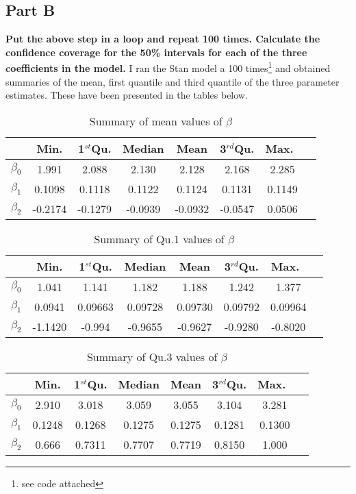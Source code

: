 \documentclass{article}
\begin{document}
\subsection{Part B}
\textbf{Put the above step in a loop and repeat 100 times. Calculate the confidence coverage for the 50\% intervals for each of the three coefficients in the model.} I ran the Stan model a 100 times\footnote{see code attached} and obtained summaries of the mean, first quantile and third quantile of the three parameter estimates. These have been presented in the tables below.
\begin{table}[H]
\caption {Summary of mean values of $\beta$}
\vspace{2mm}
\centering \begin{tabular}{c c c c c c c c} 
\hline\hline 
\vspace{1mm}
& Min. & 1$^{st}$Qu. &  Median &  Mean &  3$^{rd}$Qu.& Max.\ \\ [0.5ex] 
\hline 
$\beta_0$ & 1.991   &   2.088  &  2.130  & 2.128   &  2.168  &  2.285  \\ 
$\beta_1$ & 0.1098   &   0.1118  &  0.1122   & 0.1124 &   0.1131   & 0.1149  \\
$\beta_2$ & -0.2174   &    -0.1279  &  -0.0939  & -0.0932  &   -0.0547  &   0.0506 \\ [1ex] \hline 
\end{tabular}
\end{table}

\begin{table}[H]
\caption {Summary of Qu.1 values of $\beta$}
\vspace{2mm}
\centering \begin{tabular}{c c c c c c c c} 
\hline\hline 
\vspace{1mm}
& Min. & 1$^{st}$Qu. &  Median &  Mean &  3$^{rd}$Qu.& Max.\ \\ [0.5ex] 
\hline 
$\beta_0$ & 1.041   &   1.141  &  1.182  & 1.188   &  1.242  &  1.377  \\ 
$\beta_1$ & 0.0941   &   0.09663  &  0.09728   & 0.09730 &   0.09792   & 0.09964  \\
$\beta_2$ & -1.1420   &  -0.994  &  -0.9655  & -0.9627  &   -0.9280  &   -0.8020 \\ [1ex] \hline 
\end{tabular}
\end{table}

\begin{table}[H]
\caption {Summary of Qu.3 values of $\beta$}
\vspace{2mm}
\centering \begin{tabular}{c c c c c c c c} 
\hline\hline 
\vspace{1mm}
& Min. & 1$^{st}$Qu. &  Median &  Mean &  3$^{rd}$Qu.& Max.\ \\ [0.5ex] 
\hline 
$\beta_0$ & 2.910   &   3.018  &  3.059  & 3.055   &  3.104  &  3.281  \\ 
$\beta_1$ & 0.1248   &   0.1268  &  0.1275   & 0.1275 &   0.1281   & 0.1300  \\
$\beta_2$ & 0.666   &   0.7311  &  0.7707  & 0.7719  & 0.8150  &  1.000 \\ [1ex] \hline 
\end{tabular}
\end{table}
\end{document}

